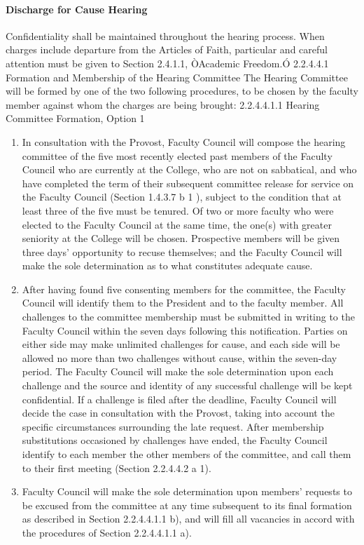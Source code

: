 \documentclass[letterpaper, 11pt]{article}
\begin{document}
			\paragraph{Discharge for Cause Hearing}
				Confidentiality shall be maintained throughout the hearing process.  When charges include departure from the Articles of Faith, particular and careful attention must be given to Section 2.4.1.1, ÒAcademic Freedom.Ó
				2.2.4.4.1 Formation and Membership of the Hearing Committee
				The Hearing Committee will be formed by one of the two following procedures, to be chosen by the faculty member against whom the charges are being brought:
				2.2.4.4.1.1 Hearing Committee Formation, Option 1
				\begin{enumerate}[label=\alph*)]
					\item{In consultation with the Provost, Faculty Council will compose the hearing committee of the five most recently elected past members of the Faculty Council who are currently at the College, who are not on sabbatical, and who have completed the term of their subsequent committee release for service on the Faculty Council (Section 1.4.3.7 b 1 ), subject to the condition that at least three of the five must be tenured.  Of two or more faculty who were elected to the Faculty Council at the same time, the one(s) with greater seniority at the College will be chosen.  Prospective members will be given three days' opportunity to recuse themselves; and the Faculty Council will make the sole determination as to what constitutes adequate cause.}
					\item{After having found five consenting members for the committee, the Faculty Council will identify them to the President and to the faculty member.  All challenges to the committee membership must be submitted in writing to the Faculty Council within the seven days following this notification.  Parties on either side may make unlimited challenges for cause, and each side will be allowed no more than two challenges without cause, within the seven-day period.  The Faculty Council will make the sole determination upon each challenge and the source and identity of any successful challenge will be kept confidential.  If a challenge is filed after the deadline, Faculty Council will decide the case in consultation with the Provost, taking into account the specific circumstances surrounding the late request.  After membership substitutions occasioned by challenges have ended, the Faculty Council identify to each member the other members of the committee, and call them to their first meeting (Section 2.2.4.4.2 a 1).}
					\item{Faculty Council will make the sole determination upon members' requests to be excused from the committee at any time subsequent to its final formation as described in Section 2.2.4.4.1.1 b), and will fill all vacancies in accord with the procedures of Section 2.2.4.4.1.1 a).}
				\end{enumerate}
\end{document}
